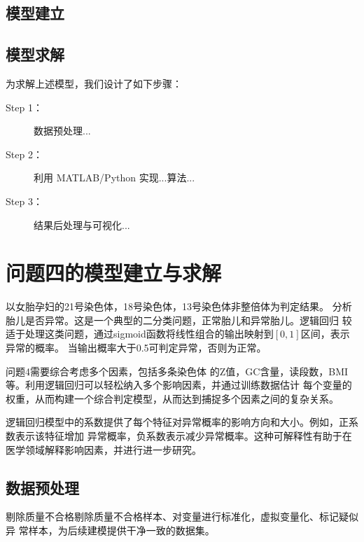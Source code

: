 \documentclass[withoutpreface,notoc]{cumcmthesis}
\begin{document}
	\subsection{模型建立}
	\subsection{模型求解}
	为求解上述模型，我们设计了如下步骤：
	
	\begin{description}
		\item[Step 1：] 数据预处理...
		\item[Step 2：] 利用 MATLAB/Python 实现...算法...
		\item[Step 3：] 结果后处理与可视化...
	\end{description}


















	\section{问题四的模型建立与求解}

	以女胎孕妇的21号染色体，18号染色体，13号染色体非整倍体为判定结果。
	分析胎儿是否异常。这是一个典型的二分类问题，正常胎儿和异常胎儿。逻辑回归
	较适于处理这类问题，通过sigmoid函数将线性组合的输出映射到$[0,1]$区间，表示异常的概率。
	当输出概率大于0.5可判定异常，否则为正常。
	
	问题4需要综合考虑多个因素，包括多条染色体
	的Z值，GC含量，读段数，BMI等。利用逻辑回归可以轻松纳入多个影响因素，并通过训练数据估计
	每个变量的权重，从而构建一个综合判定模型，从而达到捕捉多个因素之间的复杂关系。

	逻辑回归模型中的系数提供了每个特征对异常概率的影响方向和大小。例如，正系数表示该特征增加
	异常概率，负系数表示减少异常概率。这种可解释性有助于在医学领域解释影响因素，并进行进一步研究。











	\subsection{数据预处理}
	剔除质量不合格剔除质量不合格样本、对变量进行标准化，虚拟变量化、标记疑似异
	常样本，为后续建模提供干净一致的数据集。
\end{document}
